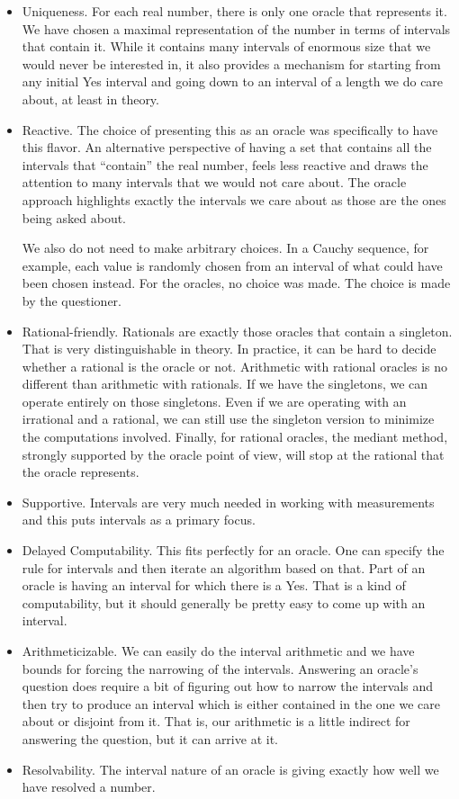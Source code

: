 \documentclass[12pt]{article}
\theoremstyle{remark}
\begin{document}
\begin{itemize}
    \item Uniqueness. For each real number, there is only one oracle that represents it. We have chosen a maximal representation of the number in terms of intervals that contain it. While it contains many intervals of enormous size that we would never be interested in, it also provides a mechanism for starting from any initial Yes interval and going down to an interval of a length we do care about, at least in theory. 
    \item Reactive. The choice of presenting this as an oracle was specifically to have this flavor. An alternative perspective of having a set that contains all the intervals that ``contain'' the real number, feels less reactive and draws the attention to many intervals that we would not care about. The oracle approach highlights exactly the intervals we care about as those are the ones being asked about. 
    
    We also do not need to make arbitrary choices. In a Cauchy sequence, for example, each value is randomly chosen from an interval of what could have been chosen instead. For the oracles, no choice was made. The choice is made by the questioner. 
    \item Rational-friendly. Rationals are exactly those oracles that contain a singleton. That is very distinguishable in theory. In practice, it can be hard to decide whether a rational is the oracle or not. Arithmetic with rational oracles is no different than arithmetic with rationals. If we have the singletons, we can operate entirely on those singletons. Even if we are operating with an irrational and a rational, we can still use the singleton version to minimize the computations involved. Finally, for rational oracles, the mediant method, strongly supported by the oracle point of view, will stop at the rational that the oracle represents.
    \item Supportive. Intervals are very much needed in working with measurements and this puts intervals as a primary focus. 
    \item Delayed Computability. This fits perfectly for an oracle. One can specify the rule for intervals and then iterate an algorithm based on that. Part of an oracle is having an interval for which there is a Yes. That is a kind of computability, but it should generally be pretty easy to come up with an interval. 
    \item Arithmeticizable. We can easily do the interval arithmetic and we have bounds for forcing the narrowing of the intervals. Answering an oracle's question does require a bit of figuring out how to narrow the intervals and then try to produce an interval which is either contained in the one we care about or disjoint from it. That is, our arithmetic is a little indirect for answering the question, but it can arrive at it.
    \item Resolvability. The interval nature of an oracle is giving exactly how well we have resolved a number. 
\end{itemize}
\end{document}
